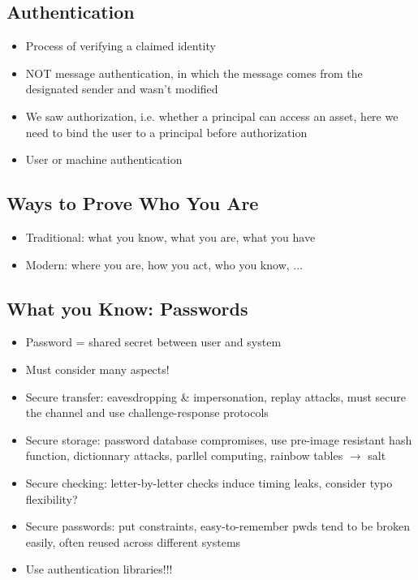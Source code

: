 \documentclass{article}
\newenvironment{myitemize}
{ \begin{itemize}
    \setlength{\itemsep}{005pt}
    \setlength{\parskip}{0pt}
    \setlength{\parsep}{0pt}     }
{ \end{itemize}                  }
\begin{document}
\begin{multicols}{2}

\section{Authentication}

\begin{myitemize}
    \item Process of verifying a claimed identity
    \item NOT message authentication, in which the message comes from the designated sender and wasn't modified
    \item We saw authorization, i.e. whether a principal can access an asset, here we need to bind the user to a principal before authorization
    \item User or machine authentication
\end{myitemize}


\subsection{Ways to Prove Who You Are}

\begin{myitemize}
    \item Traditional: what you know, what you are, what you have
    \item Modern: where you are, how you act, who you know, ...
\end{myitemize}


\subsection{What you Know: Passwords}

\begin{myitemize}
    \item Password = shared secret between user and system
    \item Must consider many aspects!
    \item Secure transfer: eavesdropping \& impersonation, replay attacks, must secure the channel and use challenge-response protocols
    \item Secure storage: password database compromises, use pre-image resistant hash function, dictionnary attacks, parllel computing, rainbow tables $\rightarrow$ salt
    \item Secure checking: letter-by-letter checks induce timing leaks, consider typo flexibility?
    \item Secure passwords: put constraints, easy-to-remember pwds tend to be broken easily, often reused across different systems
    \item Use authentication libraries!!!
\end{myitemize}


\end{multicols}
\end{document}
